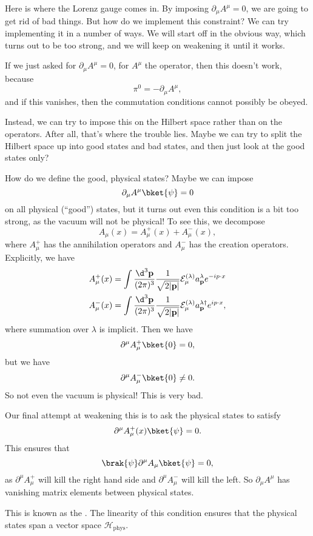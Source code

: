 \documentclass[a4paper]{article}
\begin{document}
Here is where the Lorenz gauge comes in. By imposing $\partial_\mu A^\mu = 0$, we are going to get rid of bad things. But how do we implement this constraint? We can try implementing it in a number of ways. We will start off in the obvious way, which turns out to be too strong, and we will keep on weakening it until it works.

If we just asked for $\partial_\mu A^\mu = 0$, for $A^\mu$ the operator, then this doesn't work, because
\[
  \pi^0 = - \partial_\mu A^\mu,
\]
and if this vanishes, then the commutation conditions cannot possibly be obeyed.

Instead, we can try to impose this on the Hilbert space rather than on the operators. After all, that's where the trouble lies. Maybe we can try to split the Hilbert space up into good states and bad states, and then just look at the good states only?

How do we define the good, physical states? Maybe we can impose
\[
  \partial_\mu A^\mu \bket{\psi} = 0
\]
on all physical (``good'') states, but it turns out even this condition is a bit too strong, as the vacuum will not be physical! To see this, we decompose
\[
  A_\mu(x) = A_\mu^+ (x) + A_\mu^-(x),
\]
where $A_\mu^+$ has the annihilation operators and $A_\mu^-$ has the creation operators. Explicitly, we have
\begin{align*}
  A_\mu^+(x) &= \int \frac{\d^3 \mathbf{p}}{(2\pi)^3} \frac{1}{\sqrt{2|\mathbf{p}|}} \mathcal{E}_\mu^{(\lambda)} a_\mathbf{p}^\lambda e^{-i p\cdot x}\\
  A_\mu^-(x) &= \int \frac{\d^3 \mathbf{p}}{(2\pi)^3} \frac{1}{\sqrt{2|\mathbf{p}|}} \mathcal{E}_\mu^{(\lambda)} a_\mathbf{p}^{\lambda\dagger} e^{ip\cdot x},
\end{align*}
where summation over $\lambda$ is implicit. Then we have
\[
  \partial^\mu A_\mu^+\bket{0} = 0,
\]
but we have
\[
  \partial^\mu A_\mu^- \bket{0} \not= 0.
\]
So not even the vacuum is physical! This is very bad.

Our final attempt at weakening this is to ask the physical states to satisfy
\[
  \partial^\mu A_\mu^+(x) \bket{\psi} = 0.
\]
This ensures that
\[
  \brak{\psi}\partial^\mu A_\mu \bket{\psi} = 0,
\]
as $\partial^\mu A_\mu^+$ will kill the right hand side and $\partial^\mu A_\mu^-$ will kill the left. So $\partial_\mu A^\mu$ has vanishing matrix elements between physical states.

This is known as the . The linearity of this condition ensures that the physical states span a vector space $\mathcal{H}_{\mathrm{phys}}$.
\end{document}
